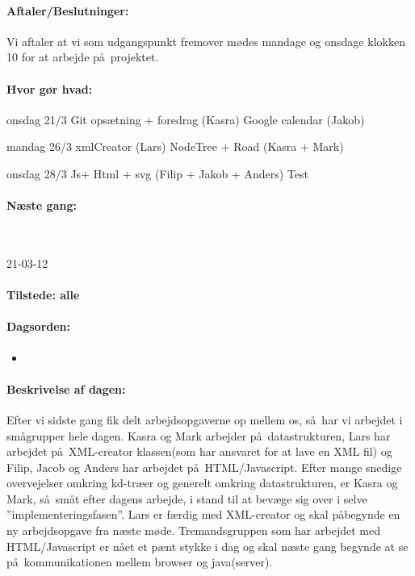 \documentclass[a4paper,10pt,titlepage]{article}
\begin{document}
		\paragraph{Aftaler/Beslutninger:}
		Vi aftaler at vi som udgangspunkt fremover m\o des mandage og onsdage klokken 10 for at arbejde p\aa \ projektet.
		\paragraph{Hvor g\o r hvad:}
		onsdag 21/3
Git ops\ae tning + foredrag (Kasra)
Google calendar (Jakob)

mandag 26/3
xmlCreator (Lars)
NodeTree + Road (Kasra + Mark)

onsdag 28/3
Js+ Html + svg (Filip + Jakob + Anders)
Test
		\paragraph{N\ae ste gang:}\mbox{}\\
			
			
			\begin{center}
		21-03-12
		\end{center}
		
		\paragraph{Tilstede: alle}
		\paragraph{Dagsorden:}
		\begin{itemize}
					\item 
					
		\end{itemize}
		
		\paragraph{Beskrivelse af dagen:}
		Efter vi sidste gang fik delt arbejdsopgaverne op mellem os, s\aa \ har vi arbejdet i sm\aa grupper hele dagen. 
Kasra og Mark arbejder p\aa \ datastrukturen, Lars har arbejdet p\aa \ XML-creator klassen(som har ansvaret for at lave en XML fil) og Filip, Jacob og Anders har arbejdet p\aa \ HTML/Javascript.
Efter mange snedige overvejelser omkring kd-tr\ae er og generelt omkring datastrukturen, er Kasra og Mark, s\aa \ sm\aa t efter dagens arbejde,  i stand til at bev\ae ge sig over i selve ”implementeringsfasen”.  Lars er f\ae rdig med XML-creator og skal p\aa begynde en ny arbejdsopgave fra n\ae ste m\o de. Tremandsgruppen som har arbejdet med HTML/Javascript er n\aa et et p\ae nt stykke i dag og skal n\ae ste gang begynde at se p\aa \ kommunikationen mellem browser og java(server).
\end{document}
